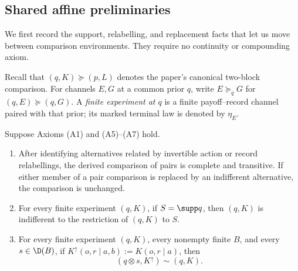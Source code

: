 \subsection{Shared affine preliminaries}

We first record the support, relabelling, and replacement facts that let us
move between comparison environments.  They require no continuity or
compounding axiom.

Recall that $(q,K)\succeq(p,L)$ denotes the paper's canonical two-block
comparison.  For channels $E,G$ at a common prior $q$, write
$E\succeq_q G$ for $(q,E)\succeq(q,G)$.  A \emph{finite experiment at $q$}
is a finite payoff--record channel paired with that prior; its marked terminal
law is denoted by $\eta_E$.

\begin{lemma}\label{lf:lem:bookkeeping}
Suppose Axioms \textup{(A1)} and \textup{(A5)--(A7)} hold.
\begin{enumerate}[label=\textup{(\alph*)},leftmargin=*]
\item After identifying alternatives related by invertible action or record
  relabellings, the derived comparison of pairs is complete and transitive.
  If either member of a pair comparison is replaced by an indifferent
  alternative, the comparison is unchanged.
\item For every finite experiment $(q,K)$, if $S=\supp q$, then $(q,K)$ is indifferent to the restriction of
  $(q,K)$ to $S$.
\item For every finite experiment $(q,K)$, every nonempty finite $B$, and
  every $s\in\D(B)$, if $K^\uparrow(o,r\mid a,b):=K(o,r\mid a)$, then
  \begin{equation}
  (q\otimes s,K^\uparrow)\sim(q,K).
  \label{lf:eq:dummy-ordinal}
  \end{equation}
\end{enumerate}
\end{lemma}


